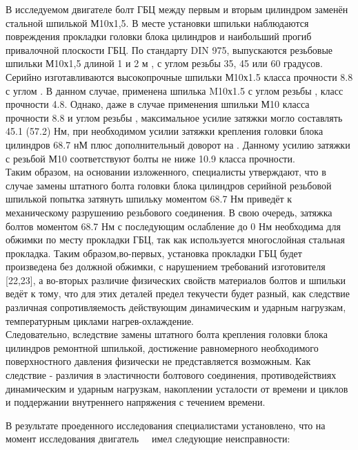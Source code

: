 \vspace{2.5mm}
  В исследуемом двигателе  болт ГБЦ между первым и вторым цилиндром  заменён стальной шпилькой М10х1,5. В месте установки шпильки наблюдаются повреждения прокладки головки блока цилиндров и наибольший прогиб привалочной плоскости ГБЦ.  По стандарту DIN 975,  выпускаются резьбовые шпильки  М10х1,5 длиной 1 и 2 м , с углом резьбы 35, 45 или 60 градусов. Серийно изготавливаются высокопрочные шпильки  М10х1.5 класса прочности  8.8 с углом . В данном случае, применена шпилька M10х1.5 с углом резьбы , класс прочности 4.8.  Однако, даже в случае применения шпильки М10 класса прочности 8.8 и углом резьбы , максимальное усилие затяжки могло составлять 45.1 (57.2) Нм, при необходимом усилии затяжки крепления головки блока цилиндров 68.7 нМ плюс дополнительный доворот на . Данному усилию затяжки с резьбой М10  соответствуют болты не ниже 10.9 класса прочности.\\ Таким образом, на основании изложенного, специалисты утверждают, что в случае замены штатного болта головки блока цилиндров серийной резьбовой шпилькой  попытка затянуть шпильку моментом 68.7 Нм приведёт к механическому разрушению резьбового соединения. В свою очередь,  затяжка болтов моментом 68.7 Нм с последующим ослабление до 0 Нм необходима для обжимки по месту  прокладки ГБЦ, так как используется многослойная стальная прокладка. Таким образом,во-первых,  установка прокладки ГБЦ будет произведена без должной обжимки, с нарушением требований изготовителя [22,23], а во-вторых различие физических свойств материалов болтов и шпильки ведёт к тому, что для этих деталей  предел текучести будет разный, как следствие различная сопротивляемость  действующим динамическим и ударным нагрузкам,  температурным циклами нагрев-охлаждение. \\
  
Следовательно, вследствие замены штатного болта крепления головки блока цилиндров ремонтной шпилькой, достижение равномерного  необходимого поверхностного давления  физически не представляется возможным. Как следствие - различия в эластичности болтового соединения, противодействиях динамическим и ударным нагрузкам, накоплении усталости от времени и циклов и поддержании внутреннего напряжения с течением времени.



В результате проеденного исследования специалистами установлено, что на момент  исследования  двигатель  \, \, имел следующие неисправности:

